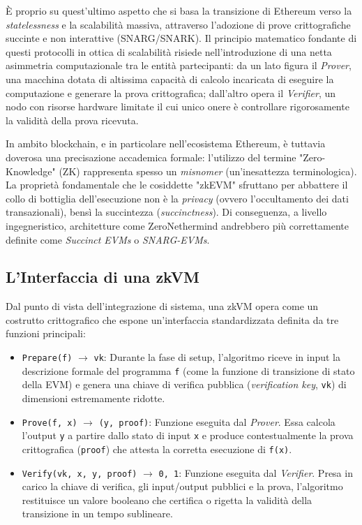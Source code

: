 \documentclass[12pt,a4paper,openright,twoside]{report}
\begin{document}
È proprio su quest'ultimo aspetto che si basa la transizione di Ethereum verso la \textit{statelessness} e la scalabilità massiva, attraverso l'adozione di prove crittografiche succinte e non interattive (SNARG/SNARK). Il principio matematico fondante di questi protocolli in ottica di scalabilità risiede nell'introduzione di una netta asimmetria computazionale tra le entità partecipanti: da un lato figura il \textit{Prover}, una macchina dotata di altissima capacità di calcolo incaricata di eseguire la computazione e generare la prova crittografica; dall'altro opera il \textit{Verifier}, un nodo con risorse hardware limitate il cui unico onere è controllare rigorosamente la validità della prova ricevuta.  

In ambito blockchain, e in particolare nell'ecosistema Ethereum, è tuttavia doverosa una precisazione accademica formale: l'utilizzo del termine "Zero-Knowledge" (ZK) rappresenta spesso un \textit{misnomer} (un'inesattezza terminologica). La proprietà fondamentale che le cosiddette "zkEVM" sfruttano per abbattere il collo di bottiglia dell'esecuzione non è la \textit{privacy} (ovvero l'occultamento dei dati transazionali), bensì la succintezza (\textit{succinctness}). Di conseguenza, a livello ingegneristico, architetture come ZeroNethermind andrebbero più correttamente definite come \textit{Succinct EVMs} o \textit{SNARG-EVMs}.

\subsection{L'Interfaccia di una zkVM}

Dal punto di vista dell'integrazione di sistema, una zkVM opera come un costrutto crittografico che espone un'interfaccia standardizzata definita da tre funzioni principali:
\begin{itemize}
    \item \texttt{Prepare(f)} $\rightarrow$ \texttt{vk}: Durante la fase di setup, l'algoritmo riceve in input la descrizione formale del programma \texttt{f} (come la funzione di transizione di stato della EVM) e genera una chiave di verifica pubblica (\textit{verification key}, \texttt{vk}) di dimensioni estremamente ridotte.
    \item \texttt{Prove(f, x)} $\rightarrow$ \texttt{(y, proof)}: Funzione eseguita dal \textit{Prover}. Essa calcola l'output \texttt{y} a partire dallo stato di input \texttt{x} e produce contestualmente la prova crittografica (\texttt{proof}) che attesta la corretta esecuzione di \texttt{f(x)}.
    \item \texttt{Verify(vk, x, y, proof)} $\rightarrow$ \texttt{{0, 1}}: Funzione eseguita dal \textit{Verifier}. Presa in carico la chiave di verifica, gli input/output pubblici e la prova, l'algoritmo restituisce un valore booleano che certifica o rigetta la validità della transizione in un tempo sublineare.
\end{itemize}
\end{document}
